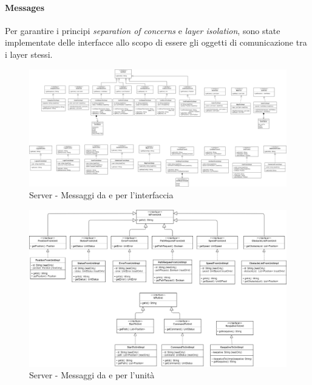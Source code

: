 \paragraph{Messages}
Per garantire i principi \textit{separation of concerns} e \textit{layer isolation}, sono state implementate delle interfacce allo scopo di essere gli oggetti di comunicazione tra i layer stessi.
\begin{figure}[H]
	\centering
	\includegraphics[width=18cm]{img/server_from_to_ui.png}
	\caption{Server - Messaggi da e per l'interfaccia}
\end{figure}
\begin{figure}[H]
	\centering
	\includegraphics[width=18cm]{img/server_from_to_unit.png}
	\caption{Server - Messaggi da e per l'unità}
\end{figure}

